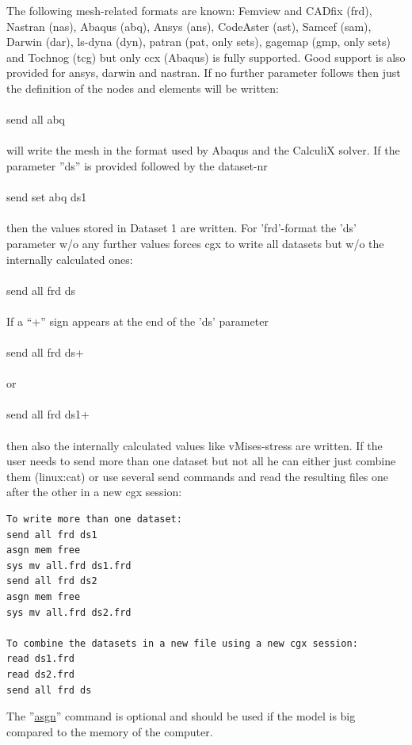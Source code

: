 \documentclass{article}
\providecommand{\htmlref}[2]{\hyperref[#2]{#1}}
\begin{document}
The following mesh-related formats are known: Femview and CADfix (frd), Nastran (nas), Abaqus (abq), Ansys (ans), CodeAster (ast), Samcef (sam), Darwin (dar), ls-dyna (dyn), patran (pat, only sets), gagemap (gmp, only sets) and Tochnog (tcg) but only ccx (Abaqus) is fully supported. Good support is also provided for ansys, darwin and nastran. If no further parameter follows then just the definition of the nodes and elements will be written:\\\\send all abq\\\\will write the mesh in the format used by Abaqus and the CalculiX solver. If the parameter ''ds'' is provided followed by the dataset-nr\\\\send set abq ds1\\\\then the values stored in Dataset 1 are written. For 'frd'-format the 'ds' parameter w/o any further values forces cgx to write all datasets but w/o the internally calculated ones:\\\\send all frd ds\\\\If a ``+'' sign appears at the end of the 'ds' parameter\\\\send all frd ds+\\\\or \\\\send all frd ds1+\\\\then also the internally calculated values like vMises-stress are written. If the user needs to send more than one dataset but not all he can either just combine them (linux:cat) or use several send commands and read the resulting files one after the other in a new cgx session:
\begin{verbatim}
To write more than one dataset:
send all frd ds1
asgn mem free
sys mv all.frd ds1.frd
send all frd ds2
asgn mem free
sys mv all.frd ds2.frd

To combine the datasets in a new file using a new cgx session:
read ds1.frd
read ds2.frd
send all frd ds
\end{verbatim}
The ''\htmlref{asgn}{asgn}'' command is optional and should be used if the model is big compared to the memory of the computer.
\end{document}
